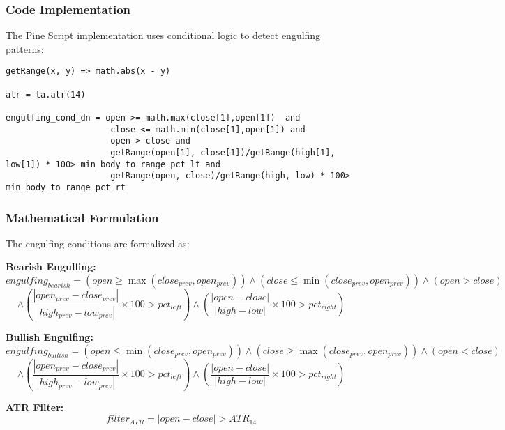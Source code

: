 \documentclass[12pt]{article}
\begin{document}
\subsubsection{Code Implementation}
The Pine Script implementation uses conditional logic to detect engulfing patterns:

\begin{lstlisting}[language=Pine, caption=Pine Script Code for Engulfing Detection]
getRange(x, y) => math.abs(x - y)

atr = ta.atr(14)

engulfing_cond_dn = open >= math.max(close[1],open[1])  and 
                     close <= math.min(close[1],open[1]) and 
                     open > close and 
                     getRange(open[1], close[1])/getRange(high[1], low[1]) * 100> min_body_to_range_pct_lt and
                     getRange(open, close)/getRange(high, low) * 100> min_body_to_range_pct_rt
\end{lstlisting}

\subsubsection{Mathematical Formulation}
The engulfing conditions are formalized as:

\textbf{Bearish Engulfing:}
\[
engulfing_{bearish} = (open \geq \max(close_{prev}, open_{prev})) \land (close \leq \min(close_{prev}, open_{prev})) \land (open > close)
\]
\[
\land \left( \frac{|open_{prev} - close_{prev}|}{|high_{prev} - low_{prev}|} \times 100 > pct_{left} \right) \land \left( \frac{|open - close|}{|high - low|} \times 100 > pct_{right} \right)
\]

\textbf{Bullish Engulfing:}
\[
engulfing_{bullish} = (open \leq \min(close_{prev}, open_{prev})) \land (close \geq \max(close_{prev}, open_{prev})) \land (open < close)
\]
\[
\land \left( \frac{|open_{prev} - close_{prev}|}{|high_{prev} - low_{prev}|} \times 100 > pct_{left} \right) \land \left( \frac{|open - close|}{|high - low|} \times 100 > pct_{right} \right)
\]

\textbf{ATR Filter:}
\[
filter_{ATR} = |open - close| > ATR_{14}
\]
\end{document}
